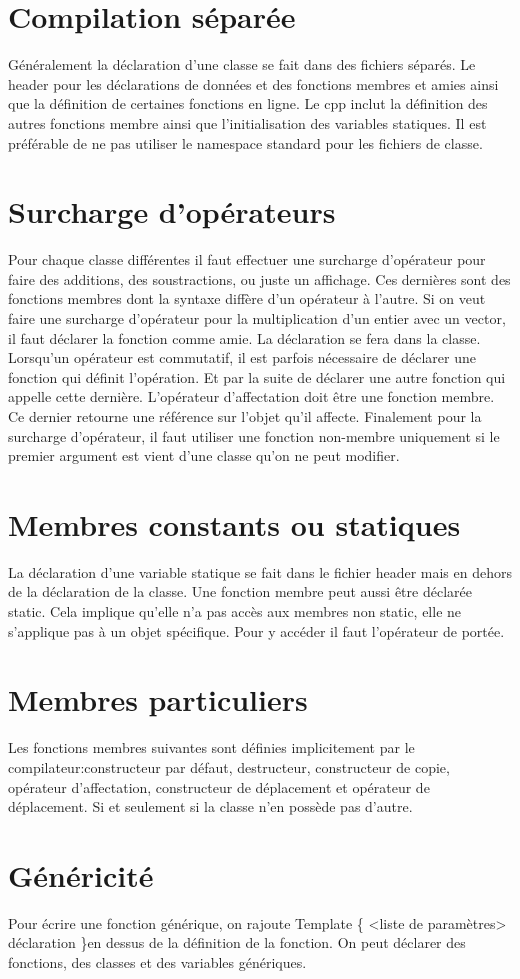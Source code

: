 \documentclass{article}
\begin{document}
\section{Compilation séparée}
Généralement la déclaration d'une classe se fait dans des fichiers séparés. Le header pour les déclarations de données et des fonctions membres et amies ainsi que la définition de certaines fonctions en ligne. Le cpp inclut la définition des autres fonctions membre ainsi que l'initialisation des variables statiques. Il est préférable de ne pas utiliser le namespace standard pour les fichiers de classe. 
\section{Surcharge d'opérateurs}
Pour chaque classe différentes il faut effectuer une surcharge d'opérateur pour faire des additions, des soustractions, ou juste un affichage. Ces dernières sont des fonctions membres dont la syntaxe diffère d'un opérateur à l'autre. Si on veut faire une surcharge d'opérateur pour la multiplication d'un entier avec un vector, il faut déclarer la fonction comme amie. La déclaration se fera dans la classe. Lorsqu'un opérateur est commutatif, il est parfois nécessaire de déclarer une fonction qui définit l'opération. Et par la suite de déclarer une autre fonction qui appelle cette dernière. 
L'opérateur d'affectation doit être une fonction membre. Ce dernier retourne une référence sur l'objet qu'il affecte. Finalement pour la surcharge d'opérateur, il faut utiliser une fonction non-membre uniquement si le premier argument est vient d'une classe qu'on ne peut modifier. 
\section{Membres constants ou statiques}
La déclaration d'une variable statique se fait dans le fichier header mais en dehors de la déclaration de la classe. Une fonction membre peut aussi être déclarée static. Cela implique qu'elle n'a pas accès aux membres non static, elle ne s'applique pas à un objet spécifique. Pour y accéder il faut l'opérateur de portée. 
\section{Membres particuliers}
Les fonctions membres suivantes sont définies implicitement par le compilateur:constructeur par défaut, destructeur, constructeur de copie, opérateur d'affectation, constructeur de déplacement et opérateur de déplacement. Si et seulement si la classe n'en possède pas d'autre. 
\section{Généricité}
Pour écrire une fonction générique, on rajoute Template \{ <liste de paramètres> déclaration \}en dessus de la définition de la fonction. On peut déclarer des fonctions, des classes et des variables génériques. 
\end{document}
